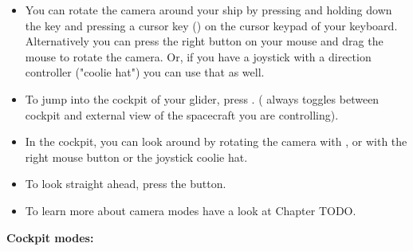 \documentclass[Orbiter User Manual.tex]{subfiles}
\begin{document}
\begin{itemize}
\item You can rotate the camera around your ship by pressing and holding down the \Ctrl key and pressing a cursor key (\DArrow\UArrow\RArrow\LArrow) on the cursor keypad of your keyboard. Alternatively you can press the right button on your mouse and drag the mouse to rotate the camera. Or, if you have a joystick with a direction controller ("coolie hat") you can use that as well.
\item To jump into the cockpit of your glider, press . ( always toggles between cockpit and external view of the spacecraft you are controlling).
\item In the cockpit, you can look around by rotating the camera with \Alt\DArrow\UArrow\RArrow\LArrow, or with the right mouse button or the joystick coolie hat.
\item To look straight ahead, press the \Home button.
\item To learn more about camera modes have a look at Chapter TODO.
\end{itemize}

\noindent
\textbf{Cockpit modes:}
\end{document}
